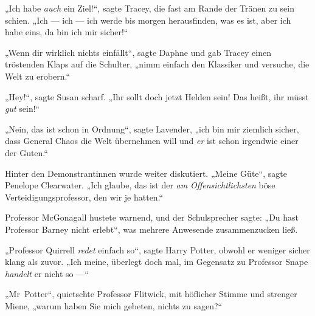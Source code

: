 „Ich habe \emph{auch} ein Ziel!“, sagte Tracey, die fast am Rande der Tränen zu sein schien.
„Ich — ich — ich werde bis morgen herausfinden, was es ist, aber ich habe eins, da bin ich mir sicher!“

„Wenn dir wirklich nichts einfällt“, sagte Daphne und gab Tracey einen tröstenden Klaps auf die Schulter, „nimm einfach den Klassiker und versuche, die Welt zu erobern.“

„Hey!“, sagte Susan scharf.
„Ihr sollt doch jetzt Helden sein! Das heißt, ihr müsst \emph{gut} sein!“

„Nein, das ist schon in Ordnung“, sagte Lavender, „ich bin mir ziemlich sicher, dass General Chaos die Welt übernehmen will und \emph{er} ist schon irgendwie einer der Guten.“

Hinter den Demonstrantinnen wurde weiter diskutiert.
„Meine Güte“, sagte Penelope Clearwater.
„Ich glaube, das ist der \emph{am} \emph{Offensichtlichsten} böse Verteidigungsprofessor, den wir je hatten.“

Professor McGonagall hustete warnend, und der Schulsprecher sagte:
„Du hast Professor Barney nicht erlebt“, was mehrere Anwesende zusammenzucken ließ.

„Professor Quirrell \emph{redet} einfach so“, sagte Harry Potter, obwohl er weniger sicher klang als zuvor.
„Ich meine, überlegt doch mal, im Gegensatz zu Professor Snape \emph{handelt} er nicht so —“

„Mr~Potter“, quietschte Professor Flitwick, mit höflicher Stimme und strenger Miene, „warum haben Sie mich gebeten, nichts zu sagen?“

